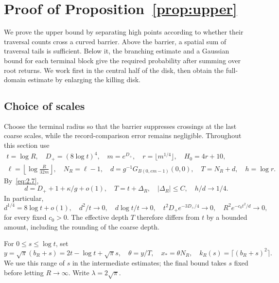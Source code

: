 \documentclass[11pt,letterpaper,reqno]{amsart}
\numberwithin{equation}{section}
\theoremstyle{remark}
\begin{document}
\section{Proof of Proposition~\ref{prop:upper}}\label{sec:upper}
We prove the upper bound by separating high points according to whether their traversal counts cross a curved barrier. Above the barrier, a spatial sum of traversal tails is sufficient. Below it, the branching estimate and a Gaussian bound for each terminal block give the required probability after summing over root returns. We work first in the central half of the disk, then obtain the full-domain estimate by enlarging the killing disk.

\subsection{Choice of scales}\label{sec:upperscales}
Choose the terminal radius so that the barrier suppresses crossings at the last coarse scales, while the record-comparison error remains negligible. Throughout this section use
\begin{equation}\label{eq:4.1}
\begin{gathered}
t=\log R,\quad D_+=(8\log t)^4,\quad m=e^{D_+},\quad
r=\lfloor m^{1/4}\rfloor,\quad H_0=4r+10,\\
\ell=\left\lfloor\log\frac R{32m}\right\rfloor,\quad N_R=\ell-1,
\quad d=g^{-1}G_{B(0,em-1)}(0,0),\quad T=N_R+d,\quad h=\log r.
\end{gathered}
\end{equation}
By~\eqref{eq:2.7},
\begin{equation}\label{eq:4.2}
d=D_++1+\kappa/g+o(1),\quad T=t+\Delta_R,
\quad |\Delta_R|\le C,\quad h/d\to1/4.
\end{equation}
In particular,
\begin{equation}\label{eq:4.3}
d^{1/4}=8\log t+o(1),\quad d^2/t\to0,\quad d\log t/t\to0,
\quad t^2D_+e^{-3D_+/4}\to0,
\quad R^2e^{-c_0t^2/d}\to0,
\end{equation}
for every fixed $c_0>0$. The effective depth $T$ therefore differs from $t$ by a bounded amount, including the rounding of the coarse depth.

For $0\le s\le\log t$, set
\begin{equation}\label{eq:4.4}
y=\sqrt\pi(b_R+s)=2t-\log t+\sqrt\pi s,\quad
\theta=y/T,\quad x_*=\theta N_R,\quad k_R(s)=\lceil(b_R+s)^2\rceil.
\end{equation}
We use this range of $s$ in the intermediate estimates; the final bound takes $s$ fixed before letting $R\to\infty$. Write $\lambda=2\sqrt\pi$.
\end{document}
